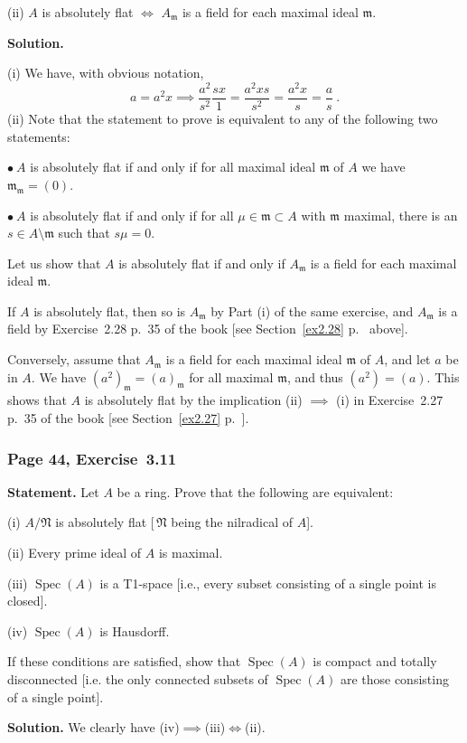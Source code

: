 \documentclass[12pt,letterpaper]{article}%
\newcommand{\mf}{\mathfrak}
\newcommand{\mmm}{\mf m}
\newcommand{\NNN}{\mf N}\newcommand{\RRR}{\mf R}
\newcommand{\bu}{\bullet}
\newcommand{\Spec}{\operatorname{Spec}}\newcommand{\Sp}{\operatorname{Spec}}
\newcommand{\nn}{\noindent}
\begin{document}
\nn(ii) $A$ is absolutely flat $\iff$ $A_\mmm$ is a field for each maximal ideal $\mmm$.

\nn\textbf{Solution.}

\nn(i) We have, with obvious notation, 
$$
a=a^2x\implies\frac{a^2}{s^2}\frac{sx}1=\frac{a^2xs}{s^2}=\frac{a^2x}s=\frac as\ .
$$ 
(ii) Note that the statement to prove is equivalent to any of the following two statements:

\nn$\bu\ A$ is absolutely flat if and only if for all maximal ideal $\mmm$ of $A$ we have $\mmm_\mmm=(0)$.

\nn$\bu\ A$ is absolutely flat if and only if for all $\mu\in\mmm\subset A$ with $\mmm$ maximal, there is an $s\in A\setminus\mmm$ such that $s\mu=0$. 

Let us show that $A$ is absolutely flat if and only if $A_\mmm$ is a field for each maximal ideal $\mmm$. 

If $A$ is absolutely flat, then so is $A_\mmm$ by Part (i) of the same exercise, and $A_\mmm$ is a field by Exercise~2.28 p.~35 of the book [see Section~\ref{ex2.28} p.~\pageref{ex2.28} above].

Conversely, assume that $A_\mmm$ is a field for each maximal ideal $\mmm$ of $A$, and let $a$ be in $A$. We have $(a^2)_\mmm=(a)_\mmm$ for all maximal $\mmm$, and thus $(a^2)=(a)$. This shows that $A$ is absolutely flat by the implication (ii) $\implies$ (i) in Exercise~2.27 p.~35 of the book [see Section~\ref{ex2.27} p.~\pageref{ex2.27}].

\subsubsection{Page 44, Exercise~3.11}\label{ex3.11}%

\textbf{Statement.} Let $A$ be a ring. Prove that the following are equivalent:

\nn(i) $A/\NNN$ is absolutely flat [$\,\NNN$ being the nilradical of $A$].

\nn(ii) Every prime ideal of $A$ is maximal.

\nn(iii)  $\Spec(A)$ is a T1-space [i.e., every subset consisting of a single point is closed].

\nn(iv) $\Spec(A)$ is Hausdorff.

If these conditions are satisfied, show that $\Spec(A)$ is compact and totally disconnected [i.e. the only connected subsets of $\Spec(A)$ are those consisting of a single point].

\nn\textbf{Solution.} We clearly have (iv)$\implies$(iii)$\iff$(ii).
\end{document}

